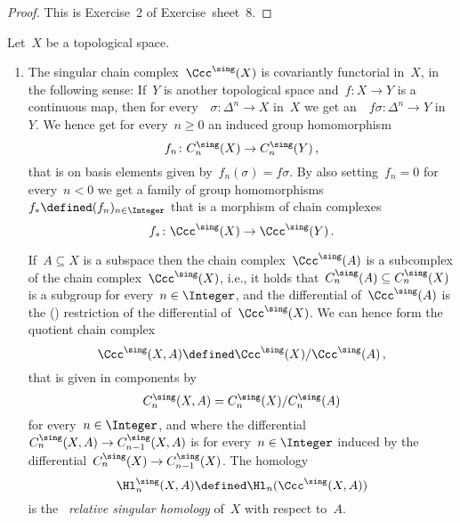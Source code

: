 \begin{proof}
  This is Exercise~2 of Exercise~sheet~8.
\end{proof}


\begin{example}
  Let~$X$ be a topological space.
  \begin{enumerate}
    \item
      The singular chain complex~$\Ccc^\sing(X)$ is covariantly functorial in~$X$, in the following sense:
      If~$Y$ is another topological space and~$f \colon X \to Y$ is a continuous map, then for every~{}~$\sigma \colon \Delta^n \to X$ in~$X$ we get an~{}~$f \sigma \colon \Delta^n \to Y$ in~$Y$.
      We hence get for every~$n \geq 0$ an induced group homomorphism
      \[
        f_n
        \colon
        C^\sing_n(X)
        \to
        C^\sing_n(Y)  \,,
      \]
      that is on basis elements given by~$f_n(\sigma) = f \sigma$.
      By also setting~$f_n = 0$ for every~$n < 0$ we get a family of group homomorphisms~$f_* \defined (f_n)_{n \in \Integer}$ that is a morphism of chain complexes
      \[
        f_*
        \colon
        \Ccc^\sing(X)
        \to
        \Ccc^\sing(Y)
        \,.
      \]
      
      If~$A \subseteq X$ is a subspace then the chain complex~$\Ccc^\sing(A)$ is a subcomplex of the chain complex~$\Ccc^\sing(X)$, i.e., it holds that~$C^\sing_n(A) \subseteq C^\sing_n(X)$ is a subgroup for every~$n \in \Integer$, and the differential of~$\Ccc^\sing(A)$ is the ({\welldef}) restriction of the differential of~$\Ccc^\sing(X)$.
      We can hence form the quotient chain complex
      \[
                  \Ccc^\sing(X,A)
        \defined  \Ccc^\sing(X)/\Ccc^\sing(A) \,,
      \]
      that is given in components by
      \[
          C^\sing_n(X,A)
        = C^\sing_n(X)/C^\sing_n(A)
      \]
      for every~$n \in \Integer$, and where the differential~$C^\sing_n(X,A) \to C^\sing_{n-1}(X,A)$ is for every~$n \in \Integer$ induced by the differential~$C^\sing_n(X) \to C^\sing_{n-1}(X)$.
      The homology
      \[
                  \Hl^\sing_n(X,A)
        \defined  \Hl_n( \Ccc^\sing(X,A) )
      \]
      is the~ \emph{relative singular homology} of~$X$ with respect to~$A$.
      

\end{enumerate}
\end{example}

